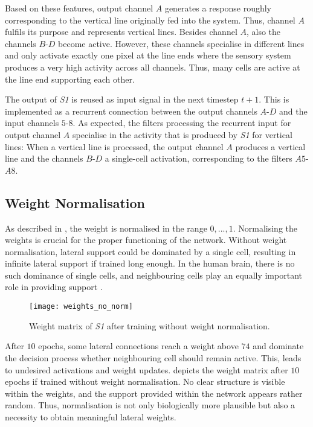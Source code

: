 Based on these features, output channel $A$ generates a response roughly corresponding to the vertical line originally fed into the system.
Thus, channel $A$ fulfils its purpose and represents vertical lines.
Besides channel $A$, also the channels $B$-$D$ become active.
However, these channels specialise in different lines and only activate exactly one pixel at the line ends where the sensory system produces a very high activity across all channels.
Thus, many cells are active at the line end supporting each other.

The output of \emph{S1} is reused as input signal in the next timestep $t+1$.
This is implemented as a recurrent connection between the output channels $A$-$D$ and the input channels $5$-$8$.
As expected, the filters processing the recurrent input for output channel $A$ specialise in the activity that is produced by \emph{S1} for vertical lines:
When a vertical line is processed, the output channel $A$ produces a vertical line and the channels $B$-$D$ a single-cell activation, corresponding to the filters $A5$-$A8$.


\subsection{Weight Normalisation}
As described in , the weight is normalised in the range $0, ..., 1$.
Normalising the weights is crucial for the proper functioning of the network. Without weight normalisation, lateral support could be dominated by a single cell, resulting in infinite lateral support if trained long enough. In the human brain, there is no such dominance of single cells, and neighbouring cells play an equally important role in providing support .


\begin{figure}[h]
    \centering
    \texttt{[image: weights\_no\_norm]}
    \caption[Weights after training without normalisation]{Weight matrix of \emph{S1} after training without weight normalisation.}
\end{figure}
%
After $10$ epochs, some lateral connections reach a weight above $74$ and dominate the decision process whether neighbouring cell should remain active.
This, leads to undesired activations and weight updates. 
 depicts the weight matrix after $10$ epochs if trained without weight normalisation.
No clear structure is visible within the weights, and the support provided within the network appears rather random. 
Thus, normalisation is not only biologically more plausible but also a necessity to obtain meaningful lateral weights.



